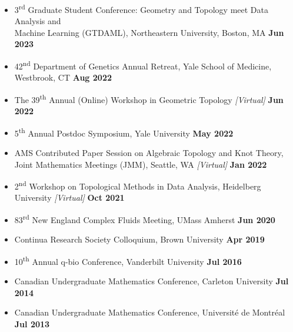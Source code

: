 \documentclass[margin,line]{res}
\begin{document}
\begin{resume}
{\begin{itemize}
\item[] 3\textsuperscript{rd} Graduate Student Conference: Geometry and Topology meet Data Analysis and \\Machine Learning (GTDAML), Northeastern University, Boston, MA \hfill {\bf Jun 2023}
\item[] 42\textsuperscript{nd} Department of Genetics Annual Retreat, Yale School of Medicine, Westbrook, CT \hfill {\bf Aug 2022}
\item[] The 39\textsuperscript{th} Annual (Online) Workshop in Geometric Topology \textit{[Virtual]} \hfill {\bf Jun 2022}
\item[] 5\textsuperscript{th} Annual Postdoc Symposium, Yale University \hfill {\bf May 2022}
\item[] AMS Contributed Paper Session on Algebraic Topology and Knot Theory, \\Joint Mathematics Meetings (JMM), Seattle, WA \textit{[Virtual]} \hfill {\bf Jan 2022} 
\item[] 2\textsuperscript{nd} Workshop on Topological Methods in Data Analysis, Heidelberg University \textit{[Virtual]} \hfill {\bf Oct 2021}
\item[] 83\textsuperscript{rd} New England Complex Fluids Meeting, UMass Amherst \hfill {\bf Jun 2020}
\item[] Continua Research Society Colloquium, Brown University \hfill {\bf Apr 2019}
\item[] 10\textsuperscript{th} Annual q-bio Conference, Vanderbilt University \hfill {\bf Jul 2016}
\item[] Canadian Undergraduate Mathematics Conference, Carleton University \hfill {\bf Jul 2014}
\item[] Canadian Undergraduate Mathematics Conference, Universit\'e de Montr\'eal \hfill {\bf Jul 2013}


\end{itemize}}
\end{resume}
\end{document}
